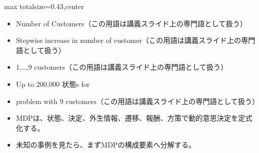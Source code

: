 \clearpage
{}
\begin{minipage}[t]{0.405\textwidth}
\begin{adjustbox}{max totalsize={\textwidth}{0.43\textheight},center}
\begin{minipage}{\textwidth}\scriptsize
{}\begin{itemize}
\item Number of Customers（この用語は講義スライド上の専門語として扱う）
\item Stepwise increase in number of customer（この用語は講義スライド上の専門語として扱う）
\item 1,…,9 customers（この用語は講義スライド上の専門語として扱う）
\item Up to 200,000 状態s for
\item problem with 9 customers（この用語は講義スライド上の専門語として扱う）
\end{itemize}\begin{itemize}
\item MDPは、状態、決定、外生情報、遷移、報酬、方策で動的意思決定を定式化する。
\item 未知の事例を見たら、まずMDPの構成要素へ分解する。
\end{itemize}
\end{minipage}
\end{adjustbox}
\end{minipage}\hfill
